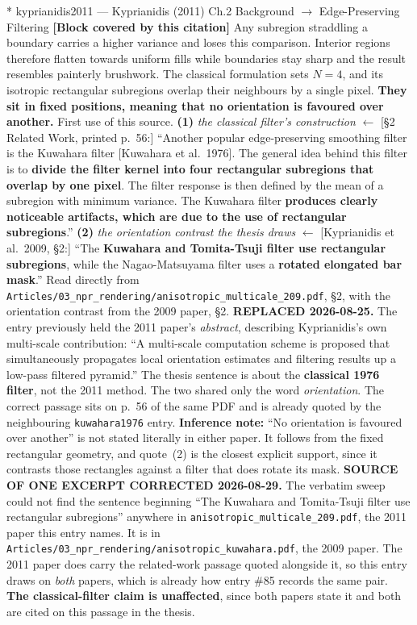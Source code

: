 \documentclass[11pt, a4paper]{article}
\makeatletter
\newcounter{citentry}
\newcommand{\citentry@core}[7]{%
  \stepcounter{citentry}
  \begingroup
  \sbox{\citentry@measurebox}{%
    \begin{minipage}{\linewidth}
      \noindent\colorbox{konstanzblue}{\parbox{\dimexpr\linewidth-2\fboxsep}{%
        \vspace{3pt}
        \textbf{\#\thecitentry \quad #2} \hfill \textit{#3}
        \vspace{3pt}
      }}
      \vspace{3pt}
      \noindent\begin{tabular}{@{}p{2.7cm} p{\dimexpr\linewidth-3cm}@{}}
        \textit{\small Sentence in thesis:} & #4 \\[5pt]
        \textbf{Usage:}\hfill       & #5 \\[5pt]
        \textit{\small Original source:}     & #6 \\[5pt]
        \textbf{How to check:}             & #7 \\
      \end{tabular}
      \vspace{5pt}
      \rule{10pt}{10pt}\quad \textbf{Validated} --- I have read the original and agree it supports the sentence.
    \end{minipage}%
  }%
  \Needspace{\dimexpr\ht\citentry@measurebox+\dp\citentry@measurebox\relax}%
  \endgroup
  \vspace{10pt}
  \noindent\colorbox{konstanzblue}{\parbox{\dimexpr\linewidth-2\fboxsep}{%
    \vspace{3pt}
    \textcolor{white}{\textbf{\#\thecitentry \quad #2}} \hfill \textcolor{white}{\textit{#3}}
    \vspace{3pt}
  }}
  \vspace{3pt}
  \noindent\begin{tabular}{@{}p{2.7cm} p{\dimexpr\linewidth-3cm}@{}}
    \textit{\small Sentence in thesis:} & \textcolor{darkgreen}{#4} \\[5pt]
    \textbf{Usage:}\hfill       & #5 \\[5pt]
    \textit{\small Original source:}     & \textcolor{darkred}{#6} \\[5pt]
    \textbf{How to check:}             & #7 \\
  \end{tabular}
  \vspace{5pt}
  \noindent\CheckBox[name=verified\thecitentry, width=10pt, height=10pt, bordercolor={0 0 0}, borderwidth=0.75, backgroundcolor={1 1 1}#1]{}\quad \textbf{Validated} --- I have read the original and agree it supports the sentence.
  \vspace{3pt}
  \noindent\textcolor{midgray}{\rule{\linewidth}{0.4pt}}
}
\newcommand{\citentry}{\@ifstar{\citentry@core{, checked}}{\citentry@core{}}}
\makeatother
\begin{document}
\begin{Form}
\citentry*
  {kyprianidis2011 --- Kyprianidis (2011)}
  {Ch.2 Background $\rightarrow$ Edge-Preserving Filtering}
  {\textbf{[Block covered by this citation]} Any subregion straddling a boundary carries a higher variance and loses this comparison. Interior regions therefore flatten towards uniform fills while boundaries stay sharp and the result resembles painterly brushwork. The classical formulation sets $N = 4$, and its isotropic rectangular subregions overlap their neighbours by a single pixel. \textbf{They sit in fixed positions, meaning that no orientation is favoured over another.}}
  {First use of this source.}
  {\textbf{(1)} \emph{the classical filter's construction} $\leftarrow$ [\S2 Related Work, printed p.~56:] ``Another popular edge-preserving smoothing filter is the Kuwahara filter [Kuwahara et al.\ 1976]. The general idea behind this filter is to \textbf{divide the filter kernel into four rectangular subregions that overlap by one pixel}. The filter response is then defined by the mean of a subregion with minimum variance. The Kuwahara filter \textbf{produces clearly noticeable artifacts, which are due to the use of rectangular subregions}.'' \quad \textbf{(2)} \emph{the orientation contrast the thesis draws} $\leftarrow$ [Kyprianidis et al.\ 2009, \S2:] ``The \textbf{Kuwahara and Tomita-Tsuji filter use rectangular subregions}, while the Nagao-Matsuyama filter uses a \textbf{rotated elongated bar mask}.''}
  {Read directly from \texttt{\footnotesize Articles/03\_npr\_rendering/anisotropic\_multicale\_209.pdf}, \S2, with the orientation contrast from the 2009 paper, \S2. \textbf{REPLACED 2026-08-25.} The entry previously held the 2011 paper's \emph{abstract}, describing Kyprianidis's own multi-scale contribution: ``A multi-scale computation scheme is proposed that simultaneously propagates local orientation estimates and filtering results up a low-pass filtered pyramid.'' The thesis sentence is about the \textbf{classical 1976 filter}, not the 2011 method. The two shared only the word \emph{orientation}. The correct passage sits on p.~56 of the same PDF and is already quoted by the neighbouring \texttt{kuwahara1976} entry. \textbf{Inference note:} ``No orientation is favoured over another'' is not stated literally in either paper. It follows from the fixed rectangular geometry, and quote~(2) is the closest explicit support, since it contrasts those rectangles against a filter that does rotate its mask. \textbf{SOURCE OF ONE EXCERPT CORRECTED 2026-08-29.} The verbatim sweep could not find the sentence beginning ``The Kuwahara and Tomita-Tsuji filter use rectangular subregions'' anywhere in \texttt{anisotropic\_multicale\_209.pdf}, the 2011 paper this entry names. It is in \texttt{\footnotesize Articles/03\_npr\_rendering/anisotropic\_kuwahara.pdf}, the 2009 paper. The 2011 paper does carry the related-work passage quoted alongside it, so this entry draws on \emph{both} papers, which is already how entry \#85 records the same pair. \textbf{The classical-filter claim is unaffected}, since both papers state it and both are cited on this passage in the thesis.}



\end{Form}
\end{document}
